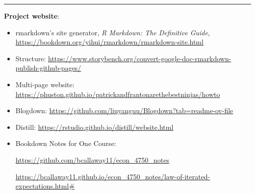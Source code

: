 \documentclass[
  a4paper,
  twoside,
  openright]{book}
\newenvironment{Shaded}{\begin{snugshade}}{\end{snugshade}}
\newcommand{\CommentTok}[1]{\textcolor[rgb]{0.56,0.35,0.01}{\textit{#1}}}
\newcommand{\ControlFlowTok}[1]{\textcolor[rgb]{0.13,0.29,0.53}{\textbf{#1}}}
\newcommand{\FunctionTok}[1]{\textcolor[rgb]{0.13,0.29,0.53}{\textbf{#1}}}
\newcommand{\NormalTok}[1]{#1}
\newcommand{\OtherTok}[1]{\textcolor[rgb]{0.56,0.35,0.01}{#1}}
\newcommand{\SpecialCharTok}[1]{\textcolor[rgb]{0.81,0.36,0.00}{\textbf{#1}}}
\newcommand{\StringTok}[1]{\textcolor[rgb]{0.31,0.60,0.02}{#1}}
\theoremstyle{definition}
\theoremstyle{definition}
\theoremstyle{definition}
\theoremstyle{definition}
\theoremstyle{remark}
\begin{document}
\begin{Shaded}
\end{Shaded}

\begin{center}\rule{0.5\linewidth}{0.5pt}\end{center}

\textbf{Project website}:

\begin{itemize}
\item
  rmarkdown's site generator, \emph{R Markdown: The Definitive Guide}, \url{https://bookdown.org/yihui/rmarkdown/rmarkdown-site.html}
\item
  Structure: \url{https://www.storybench.org/convert-google-doc-rmarkdown-publish-github-pages/}
\item
  Multi-page website: \url{https://phuston.github.io/patrickandfrantonarethebestninjas/howto}
\item
  Blogdown: \url{https://github.com/liuyanguu/Blogdown?tab=readme-ov-file}
\item
  Distill: \url{https://rstudio.github.io/distill/website.html}
\item
  Bookdown Notes for One Course:

  \url{https://github.com/bcallaway11/econ_4750_notes}

  \url{https://bcallaway11.github.io/econ_4750_notes/law-of-iterated-expectations.html\#}
\end{itemize}
\end{document}
